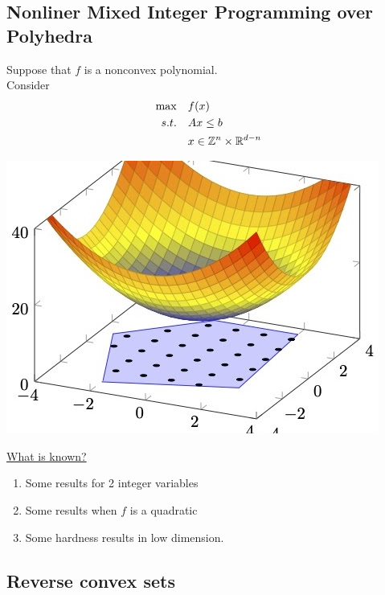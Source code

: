 \documentclass{article}
\begin{document}
\subsection{Nonliner Mixed Integer Programming over Polyhedra}
\begin{minipage}{0.5\textwidth}
Suppose that $f$ is a nonconvex polynomial.\\
  Consider
\begin{equation}
\label{eq:ILP}
\begin{split}
\max \quad & f(x)\\
s.t.  \quad & Ax \leq b\\
& x \in {\mathbb{Z}}^n \times \mathbb{R}^{d-n}
\end{split}
\end{equation}
\end{minipage}
\begin{minipage}{0.5\textwidth}
\begin{center}
\includegraphics[scale = 0.3]{presentation_figures/minlp}
\end{center}
\end{minipage}
\underline{What is known?}
\begin{enumerate}
\item Some results for 2 integer variables
\item Some results when $f$ is a quadratic
\item Some hardness results in low dimension.
\end{enumerate}



\subsection{Reverse convex sets}
\end{document}
